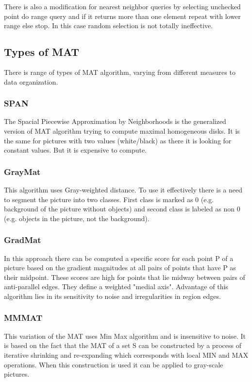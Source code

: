 There is also a modification for nearest neighbor queries by selecting unchecked point do range query and if it returns more than one element repeat with lower range else stop. In this case random selection is not totally ineffective.
\subsection{Types of MAT}
There is range of types of MAT algorithm, varying from different measures to data organization.
\subsubsection{SPAN}
The Spacial Piecewise Approximation by Neighborhoods is the generalized version of MAT algorithm trying to compute maximal homogeneous disks. It is the same for pictures with two values (white/black) as there it is looking for constant values. But it is expensive to compute.
\subsubsection{GrayMat}
This algorithm uses Gray-weighted distance. To use it effectively there is a need to segment the picture into two classes. First class is marked as 0 (e.g. background of the picture without objects) and second class is labeled as non 0 (e.g. objects in the picture, not the background).
\subsubsection{GradMat}
In this approach there can be computed a specific score for each point P of a picture based on the gradient magnitudes at all pairs of points that have P as their midpoint. These scores are high for points that lie midway between pairs of anti-parallel edges. They define a weighted "medial axis". 
Advantage of this algorithm lies in its sensitivity to noise and irregularities in region edges.
\subsubsection{MMMAT}
This variation of the MAT uses Min Max algorithm and is insensitive to noise. It is based on the fact that the MAT of a set S can be constructed by a process of iterative shrinking and re-expanding which corresponds with local MIN and MAX operations. When this construction is used it can be applied to gray-scale pictures. \cite{MMMAT}
